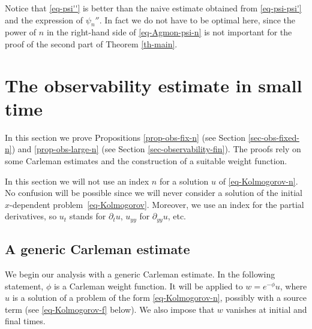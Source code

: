 \documentclass[JEP,XML,SOM,Unicode]{cedram}
\theoremstyle{plain}
\theoremstyle{definition}
\newcommand{\1}{\mathds 1}
\let\vf\phi
\begin{document}
Notice that \eqref{eq-psi''} is better than the naive estimate obtained from \eqref{eq-psi-psi'} and the expression of $\psi_n''$. In fact we do not have to be optimal here, since the power of $n$ in the right-hand side of \eqref{eq-Agmon-psi-n} is not important for the proof of the second part of Theorem \ref{th-main}.

\section{The observability estimate in small time} \label{sec-Carleman}

In this section we prove Propositions \ref{prop-obs-fix-n} (see Section \ref{sec-obs-fixed-n}) and \ref{prop-obs-large-n} (see Section \ref{sec-observability-fin}). The proofs rely on some Carleman estimates and the construction of a suitable weight function.

In this section we will not use an index $n$ for a solution $u$ of \eqref{eq-Kolmogorov-n}. No confusion will be possible since we will never consider a solution of the initial $x$-dependent problem~\eqref{eq-Kolmogorov}. Moreover, we use an index for the partial derivatives, so $u_t$ stands for $\partial_t u$, $u_{yy}$ for $\partial_{yy} u$, etc.

\subsection{A generic Carleman estimate}

We begin our analysis with a generic Carleman estimate. In the following statement, $\vf$ is a Carleman weight function. It will be applied to $w = e^{-\vf} u$, where $u$ is a solution of a problem of the form \eqref{eq-Kolmogorov-n}, possibly with a source term (see \eqref{eq-Kolmogorov-f} below). We also impose that $w$ vanishes at initial and final times.
\end{document}
